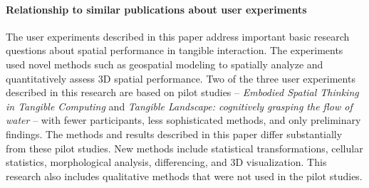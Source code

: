 \documentclass[prodmode,acmtochi]{acmsmall} %
\begin{document}
\paragraph{Relationship to similar publications about user experiments}

The user experiments described in this paper 
address important basic research questions 
about spatial performance in tangible interaction.
%
The experiments used novel methods such as geospatial modeling 
to spatially analyze and quantitatively assess 3D spatial performance. 
%
Two of the three user experiments described in this research 
are based on pilot studies 
--
\emph{Embodied Spatial Thinking in Tangible Computing}
\cite{Harmon2016b}
and
\emph{Tangible Landscape: cognitively grasping the flow of water}
\cite{Harmon2016c}
--
with fewer participants, less sophisticated methods, and only preliminary findings.
% 
The methods and results described in this paper 
differ substantially from these pilot studies. 
New methods include statistical transformations, 
cellular statistics, morphological analysis, differencing, and 3D visualization. 
%
This research also includes qualitative methods 
that were not used in the pilot studies.
















\end{document}
